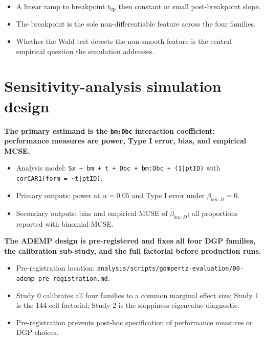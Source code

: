 \documentclass[
  11pt,
]{article}
\begin{document}
\begin{itemize}\setlength{\itemsep}{2pt}\setlength{\parskip}{0pt}
\item A linear ramp to breakpoint $t_\mathrm{bp}$ then
  constant or small post-breakpoint slope.
\item The breakpoint is the sole non-differentiable feature
  across the four families.
\item Whether the Wald test detects the non-smooth feature is
  the central empirical question the simulation addresses.
\end{itemize}

\section{Sensitivity-analysis simulation design}\label{sensitivity-analysis-simulation-design}

\textbf{The primary estimand is the \texttt{bm:Dbc} interaction
coefficient; performance measures are power, Type I error,
bias, and empirical MCSE.}

\begin{itemize}\setlength{\itemsep}{2pt}\setlength{\parskip}{0pt}
\item Analysis model:
  \texttt{Sx \textasciitilde{} bm + t + Dbc + bm:Dbc + (1|ptID)} with
  \texttt{corCAR1(form = \textasciitilde{}t|ptID)}.
\item Primary outputs: power at $\alpha = 0.05$ and Type I
  error under $\beta_{bm:D} = 0$.
\item Secondary outputs: bias and empirical MCSE of
  $\hat\beta_{bm:D}$; all proportions reported with
  binomial MCSE.
\end{itemize}

\textbf{The ADEMP design is pre-registered and fixes all four
DGP families, the calibration sub-study, and the full factorial
before production runs.}

\begin{itemize}\setlength{\itemsep}{2pt}\setlength{\parskip}{0pt}
\item Pre-registration location:
  \texttt{analysis/scripts/gompertz-evaluation/00-ademp-pre-registration.md}.
\item Study 0 calibrates all four families to a common marginal
  effect size; Study 1 is the 144-cell factorial; Study 2 is
  the sloppiness eigenvalue diagnostic.
\item Pre-registration prevents post-hoc specification of
  performance measures or DGP choices.
\end{itemize}
\end{document}
